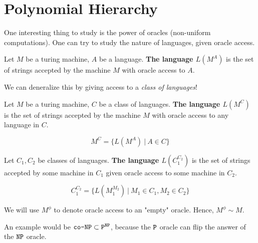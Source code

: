 \section{Polynomial Hierarchy}

One interesting thing to study is the power of oracles (non-uniform computations).
One can try to study the nature of languages, given oracle access.

\begin{definition}
Let $M$ be a turing machine, $A$ be a language. \textbf{The language $L(M^A)$} is the
set of strings accepted by the machine $M$ with oracle access to $A$.
\end{definition}

We can deneralize this by giving access to a \textit{class of languages}!

\begin{definition}
Let $M$ be a turing machine, $C$ be a class of languages. 
\textbf{The language $L(M^C)$} is the
set of strings accepted by the machine $M$ with oracle access to any language
in $C$.

$$
M^C = \{ L(M^A)~\vert~A \in C \}
$$
\end{definition}

\begin{definition}
Let $C_1, C_2$ be classes of languages.
\textbf{The language $L(C_1^{C_2})$} is the
set of strings accepted by some machine in $C_1$ given oracle access to 
some machine in $C_2$.

$$
C_1^{C_2} = \{ L(M_1^{M_2})~\vert~M_1 \in C_1, M_2 \in C_2 \}
$$
\end{definition}

We will use $M^\phi$ to denote oracle access to an "empty" oracle. Hence, $M^\phi \sim M$.

An example would be $\texttt{co-NP} \subset \texttt{P}^{\texttt{NP}}$, because the $\texttt{P}$
oracle can flip the answer of the $\texttt{NP}$ oracle.


